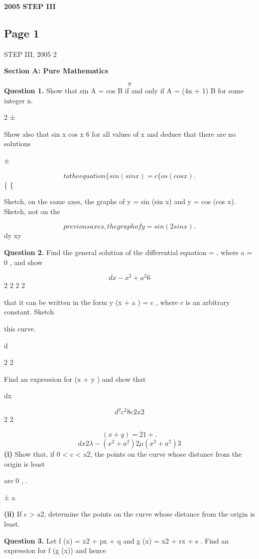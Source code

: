 \documentclass[12pt]{article}
\begin{document}
\begin{center}
{\Large \textbf{2005 STEP III}}
\end{center}

\subsection*{Page 1}
\begin{flushleft}
STEP III, 2005 2\par
\bigskip\textbf{Section A: Pure Mathematics}\par
\[\pi\]
\bigskip\textbf{Question 1.} Show that sin A = cos B if and only if A = (4n + 1) B for some integer n.\par
2 ±\par
Show also that sin x cos x 6  for all values of x and deduce that there are no solutions\par
±\par
\[to the equation \{sin (sin x) = c\{os (cos x).\]
\{ \{\par
Sketch, on the same axes, the graphs of y = sin (sin x) and y = cos (cos x). Sketch, not on the\par
\[previous axes, the graph of y = sin (2 sin x).\]
dy xy\par
\bigskip\textbf{Question 2.} Find the general solution of the differential equation = , where a = 0 , and show\par
\[dx - x^2 + a^2 6\]
2 2 2 2\par
that it can be written in the form y (x + a ) = c , where c is an arbitrary constant. Sketch\par
this curve.\par
d\par
2 2\par
Find an expression for (x + y ) and show that\par
dx\par
\[d^2 c^2 8c2x2\]
2 2\par
\[(x + y ) = 2 1 + .\]
\[dx2 \lambda - (x^2 + a^2)2 \mu (x^2 + a^2)3\]
\textbf{(i)} Show that, if 0 < c < a2, the points on the curve whose distance from the origin is least\par
are 0 , .\par
± a\par
\gamma \delta\par
\textbf{(ii)} If c > a2, determine the points on the curve whose distance from the origin is least.\par
\bigskip\textbf{Question 3.} Let f (x) = x2 + px + q and g (x) = x2 + rx + s . Find an expression for f (g (x)) and hence\par

\end{flushleft}
\end{document}
